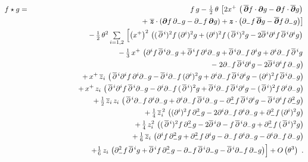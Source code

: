 \documentclass[11pt,a4paper]{article}
\newcommand{\mbf}[1]{{\boldsymbol {#1} }}
\def\ii{{\,{\rm i}\,}}
\def\mz{{\mbf z}}
\def\mdell{{\mbf\partial}}
\def\nn{\nonumber}
\def\d{\partial}
\begin{document}
\begin{eqnarray}
  \label{eq:weyl:positionspace}
  f\star g&=&f\,g-\mbox{$\frac{\ii}2$}\,\theta\,\left[
  2x^+\,\left(\,\overline{\mdell}f\cdot\mdell g
  - \mdell f\cdot\overline{\mdell}g\right)\right.\\\nonumber
  &&\qquad\qquad\qquad+\left.\overline{\mz}\cdot\left(\mdell f\,\d_- g
  - \d_- f\,\mdell g\right)+ \mz\cdot\left(\d_- f\,\overline{\mdell}g
   - \overline{\mdell}f\,\d_- g\right)\right]\\ \nonumber
  &&-\,\mbox{$\frac1{2}$}\,\theta^2\,\mbox{$\sum\limits_{i=1,2}$}\,\left[
  \left(x^+\right)^2\,
  \left((\,\overline{\d}{}^{\,i})^2f\,(\d^i)^2g
  +(\d^i)^2f\,(\,\overline{\d}{}^{\,i})^2g
  -2\overline{\d}{}^{\,i}\d^if\,\overline{\d}{}^{\,i}\d^ig
  \right)\right.\\ \nonumber &&\qquad\qquad\quad\quad
  -\,\mbox{$\frac13$}\,x^+\,\left(\d^if\,\overline{\d}{}^{\,i}\d_- g
  +\overline{\d}{}^{\,i}f\,\d^i\d_- g
  +\overline{\d}{}^{\,i}\d_- f\,\d^ig
  +\d^i\d_- f\,\overline{\d}{}^{\,i}g\right.\\ \nonumber
  &&\qquad\qquad\qquad\qquad\qquad\quad\quad
  -\left.2\partial_-f\,\overline{\d}{}^{\,i}
  \d^ig-2\overline{\d}{}^{\,i}\partial^if\,
  \partial_-g\right)\\\nonumber&&\qquad\qquad\quad\quad
  +\,x^+\,\overline{z}_i\,\left(\,\overline{\d}{}^{\,i}
  \d^if\,\d^i\d_- g
  -\overline{\d}{}^{\,i}\d_- f\,(\d^i)^2g
  +\d^i\d_- f\,\overline{\d}{}^{\,i}\d^ig
  -(\d^i)^2f\,\overline{\d}{}^{\,i}\d_- g\right)
  \\ \nonumber &&\qquad\qquad\quad\quad
  +\,x^+\,z_i\,\left(\,\overline{\d}{}^{\,i}\d^if\,\overline{\d}{}^{\,i}\d_- g
  -\d^i\d_- f\,(\,\overline{\d}{}^{\,i})^2g
  +\overline{\d}{}^{\,i}\d_- f\,\overline{\d}{}^{\,i}\d^ig
  -(\,\overline{\d}{}^{\,i})^2f\,\d^i\d_- g\right)\\ \nonumber
  &&\qquad\qquad\quad\quad
  +\,\mbox{$\frac12$}\,\overline{z}_i\,z_i\,\left(\,
  \overline{\d}{}^{\,i}\d_- f\,\d^i\d_- g
  +\d^i\d_- f\,\overline{\d}{}^{\,i}\d_- g
  -\d_- ^2f\,\overline{\d}{}^{\,i}\d^ig
  -\overline{\d}{}^{\,i}\d^if\,\d_-^2g\right)
  \\ \nonumber &&\qquad\qquad\quad\quad
  +\,\mbox{$\frac14$}\,\overline{z}_i^{\,2}\,
  \left((\d^i)^2f\,\d_-^2g
  -2\d^i\d_- f\,\d^i\d_- g
  +\d_-^2f\,(\d^i)^2g\right)\\ \nonumber &&\qquad\qquad\quad\quad
  +\,\mbox{$\frac14$}\,z_i^2\,
  \left((\,\overline{\d}{}^{\,i})^2f\,\d_-^2g
  -2\overline{\d}{}^{\,i}\d- f\,\overline{\d}{}^{\,i}\d_- g
  +\d_-^2f\,(\,\overline{\d}{}^{\,i})^2g\right)
  \\ \nonumber &&\qquad\qquad\quad\quad
  +\,\mbox{$\frac16$}\,\overline{z}_i\,\left(\d^if\,\d_-^2g
  +\d_-^2f\,\d^ig-\partial_-f\,\partial^i
  \partial_-g-\partial^i\partial_-f\,\partial_-g\right)
  \\&&\qquad\qquad\quad\quad
  +\Bigl.\mbox{$\frac16$}\,z_i\,\left(\d_-^2f\,\overline{\d}{}^{\,i}g
  +\overline{\d}{}^{\,i}f\,\d_-^2g-\partial_-f\,\overline{\partial}{}^{\,i}\d_-g-
  \overline{\d}{}^{\,i}\d_-f\,\d_-g\right)
  \Bigr]+O\left(\theta^3\right) \ . \nn\\ &&
\end{eqnarray}
\end{document}
